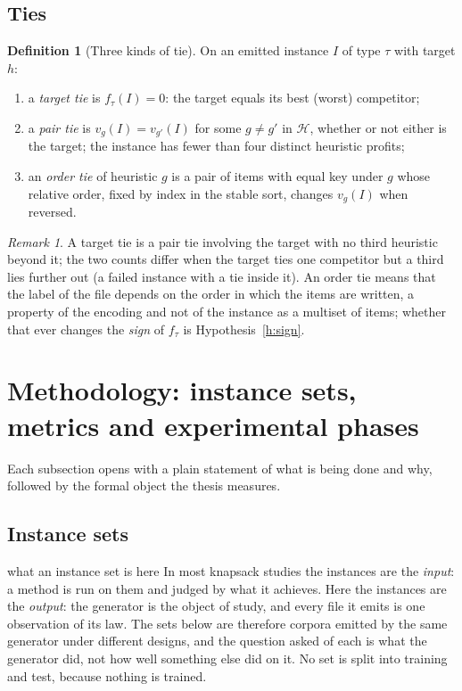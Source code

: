 \documentclass[a4paper,11pt]{article}
\newcommand{\heur}{\mathcal{H}}
\theoremstyle{plain}
\theoremstyle{definition}
\newtheorem{definition}{Definition}
\theoremstyle{remark}
\newtheorem{remark}{Remark}
\begin{document}
\subsection{Ties}\label{sec:ties}

\begin{definition}[Three kinds of tie]\label{def:ties}
On an emitted instance $I$ of type $\tau$ with target $h$:
\begin{enumerate}[leftmargin=1.8em,itemsep=2pt]
\item a \emph{target tie} is $f_\tau(I)=0$: the target equals its best (worst) competitor;
\item a \emph{pair tie} is $v_g(I)=v_{g'}(I)$ for some $g\ne g'$ in $\heur$, whether or not
either is the target; the instance has fewer than four distinct heuristic profits;
\item an \emph{order tie} of heuristic $g$ is a pair of items with equal key under $g$ whose
relative order, fixed by index in the stable sort, changes $v_g(I)$ when reversed.
\end{enumerate}
\end{definition}

\begin{remark}
A target tie is a pair tie involving the target with no third heuristic beyond it; the two
counts differ when the target ties one competitor but a third lies further out (a failed
instance with a tie inside it). An order tie means that the label of the file depends on the
order in which the items are written, a property of the encoding and not of the instance
as a multiset of items; whether that ever changes the \emph{sign} of $f_\tau$ is
Hypothesis~\ref{h:sign}.
\end{remark}

\section{Methodology: instance sets, metrics and experimental phases}\label{sec:method}

Each subsection opens with a plain statement of what is being done and why, followed by
the formal object the thesis measures.

\subsection{Instance sets}\label{sec:sets}

\begin{plain}{what an instance set is here}
In most knapsack studies the instances are the \emph{input}: a method is run on them and
judged by what it achieves. Here the instances are the \emph{output}: the generator is the
object of study, and every file it emits is one observation of its law. The sets below
are therefore corpora emitted by the same generator under different designs, and the
question asked of each is what the generator did, not how well something else did on it.
No set is split into training and test, because nothing is trained.
\end{plain}
\end{document}
